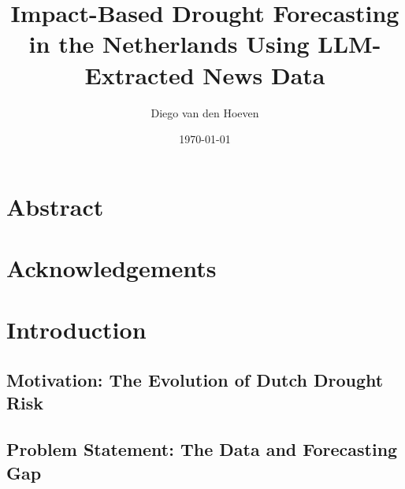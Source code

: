 \documentclass[11pt, a4paper, oneside]{book}
\title{\textbf{Impact-Based Drought Forecasting in the Netherlands Using LLM-Extracted News Data}}
\author{Diego van den Hoeven}
\date{\today}
\begin{document}
\frontmatter
\maketitle

\chapter*{Abstract}
\chapter*{Acknowledgements}

{\small
  \singlespacing
  \tableofcontents
}

\listoffigures
\listoftables

\mainmatter

\chapter{Introduction}









\section{Motivation: The Evolution of Dutch Drought Risk}


\section{Problem Statement: The Data and Forecasting Gap}

\end{document}
